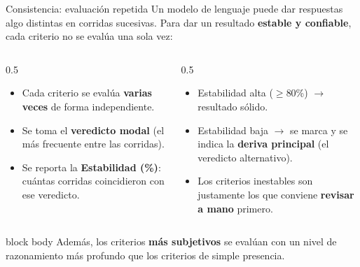 \documentclass[aspectratio=169,11pt]{beamer}
\newcommand{\redlead}[1]{\textbf{\color{iloRed}#1}}
\newcommand{\bluelead}[1]{\textbf{\color{iloBlue}#1}}
\begin{document}
\begin{frame}{Consistencia: evaluación repetida}
  \small
  Un modelo de lenguaje puede dar respuestas algo distintas en corridas sucesivas. Para dar un resultado \bluelead{estable y confiable}, cada criterio no se evalúa una sola vez:
  \vspace{0.2cm}
  \begin{columns}[T]
    \begin{column}{0.5\textwidth}
      \begin{itemize}
        \item Cada criterio se evalúa \redlead{varias veces} de forma independiente.
        \item Se toma el \bluelead{veredicto modal} (el más frecuente entre las corridas).
        \item Se reporta la \bluelead{Estabilidad (\%)}: cuántas corridas coincidieron con ese veredicto.
      \end{itemize}
    \end{column}
    \begin{column}{0.5\textwidth}
      \begin{itemize}
        \item Estabilidad alta ($\geq$80\%) $\to$ resultado sólido.
        \item Estabilidad baja $\to$ se marca y se indica la \redlead{deriva principal} (el veredicto alternativo).
        \item Los criterios inestables son justamente los que conviene \bluelead{revisar a mano} primero.
      \end{itemize}
    \end{column}
  \end{columns}
  \vspace{0.15cm}
  \begin{beamercolorbox}[wd=\textwidth,sep=5pt]{block body}
    \centering\footnotesize Además, los criterios \textbf{más subjetivos} se evalúan con un nivel de razonamiento más profundo que los criterios de simple presencia.
  \end{beamercolorbox}
\end{frame}

\end{document}
